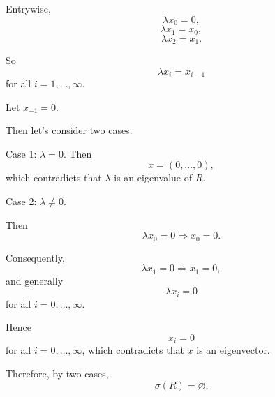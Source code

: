 \documentclass[11pt,a4paper]{article}
\newcommand{\spec}{\sigma}
\begin{document}
Entrywise,
\[
\lambda x_0=0,
\]
\[
\lambda x_1=x_0,
\]
\[
\lambda x_2=x_1.
\]

So
\[
\lambda x_i=x_{i-1}
\]
for all $i=1,\ldots,\infty$.

Let $x_{-1}=0$.

Then let's consider two cases.

Case 1: $\lambda=0$. Then
\[
x=(0,\ldots,0),
\]
which contradicts that $\lambda$ is an eigenvalue of $R$.

Case 2: $\lambda\neq0$.

Then
\[
\lambda x_0=0\Rightarrow x_0=0.
\]

Consequently,
\[
\lambda x_1=0\Rightarrow x_1=0,
\]
and generally
\[
\lambda x_i=0
\]
for all $i=0,\ldots,\infty$.

Hence
\[
x_i=0
\]
for all $i=0,\ldots,\infty$, which contradicts that $x$ is an eigenvector.

Therefore, by two cases,
\[
\spec(R)=\varnothing.
\]
\end{document}
